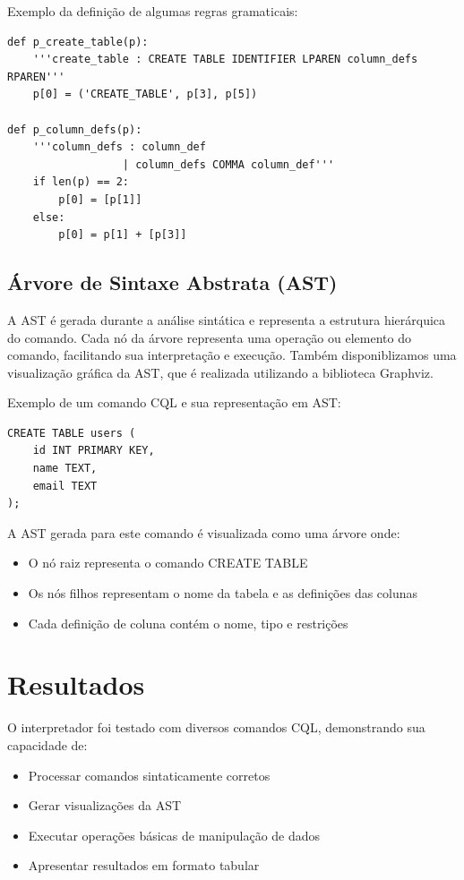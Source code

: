\documentclass[12pt]{article}
\begin{document}
Exemplo da definição de algumas regras gramaticais:

\begin{verbatim}
def p_create_table(p):
    '''create_table : CREATE TABLE IDENTIFIER LPAREN column_defs RPAREN'''
    p[0] = ('CREATE_TABLE', p[3], p[5])

def p_column_defs(p):
    '''column_defs : column_def
                  | column_defs COMMA column_def'''
    if len(p) == 2:
        p[0] = [p[1]]
    else:
        p[0] = p[1] + [p[3]]
\end{verbatim}

\subsection{Árvore de Sintaxe Abstrata (AST)}
A AST é gerada durante a análise sintática e representa a estrutura hierárquica do comando. 
Cada nó da árvore representa uma operação ou elemento do comando, facilitando sua interpretação 
e execução. Também disponiblizamos uma visualização gráfica da AST, que é realizada utilizando a biblioteca Graphviz.

Exemplo de um comando CQL e sua representação em AST:

\begin{verbatim}
CREATE TABLE users (
    id INT PRIMARY KEY,
    name TEXT,
    email TEXT
);
\end{verbatim}

A AST gerada para este comando é visualizada como uma árvore onde:
\begin{itemize}
    \item O nó raiz representa o comando CREATE TABLE
    \item Os nós filhos representam o nome da tabela e as definições das colunas
    \item Cada definição de coluna contém o nome, tipo e restrições
\end{itemize}

\section{Resultados}
O interpretador foi testado com diversos comandos CQL, demonstrando sua capacidade de:
\begin{itemize}
    \item Processar comandos sintaticamente corretos
    \item Gerar visualizações da AST
    \item Executar operações básicas de manipulação de dados
    \item Apresentar resultados em formato tabular
\end{itemize}
\end{document}
